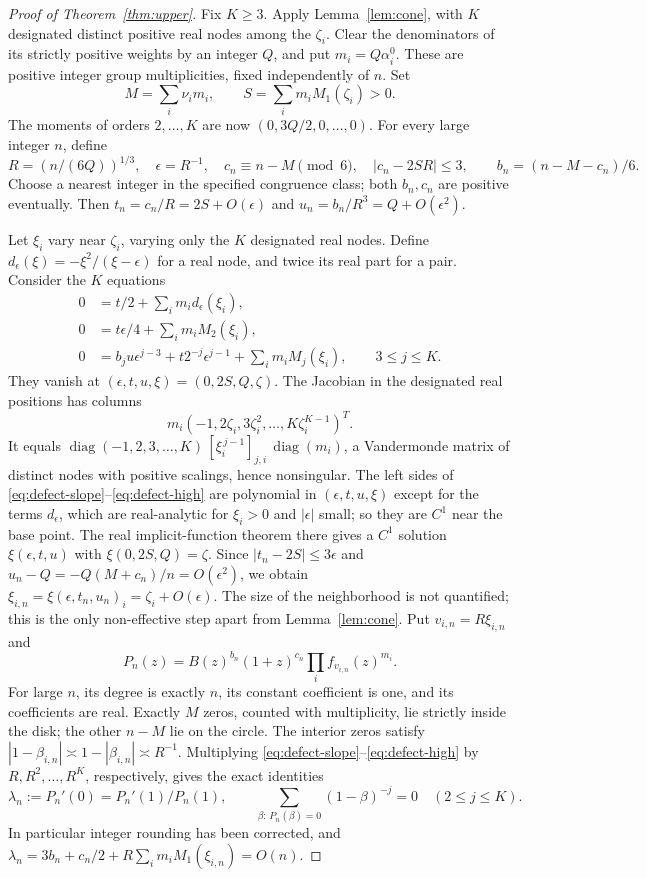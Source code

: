 \documentclass[11pt]{article}
\theoremstyle{remark}\newtheorem{remark}[theorem]{Remark}
\begin{document}
\begin{proof}[Proof of Theorem~\ref{thm:upper}]
Fix \(K\ge3\). Apply Lemma~\ref{lem:cone}, with \(K\) designated
distinct positive real nodes among the \(\zeta_i\). Clear the
denominators of its strictly positive weights by an integer \(Q\),
and put \(m_i=Q\alpha_i^0\). These are positive integer group
multiplicities, fixed independently of \(n\). Set
\[
 M=\sum_i\nu_i m_i,\qquad S=\sum_i m_i M_1(\zeta_i)>0.
\]
The moments of orders \(2,\ldots,K\) are now
\((0,3Q/2,0,\ldots,0)\).
For every large integer \(n\), define
\[
 R=(n/(6Q))^{1/3},\quad \epsilon=R^{-1},\quad
 c_n\equiv n-M\pmod6,\quad |c_n-2SR|\le3,
 \qquad b_n=(n-M-c_n)/6.
\]
Choose a nearest integer in the specified congruence class; both
\(b_n,c_n\) are positive eventually. Then
\(t_n=c_n/R=2S+O(\epsilon)\) and
\(u_n=b_n/R^3=Q+O(\epsilon^2)\).

Let \(\xi_i\) vary near \(\zeta_i\), varying only the \(K\)
designated real nodes. Define
\(d_\epsilon(\xi)=-\xi^2/(\xi-\epsilon)\) for a real node,
and twice its real part for a pair. Consider the \(K\) equations
\begin{align}
 0&=t/2+\sum_i m_i d_\epsilon(\xi_i),\label{eq:defect-slope}\\
 0&=t\epsilon/4+\sum_i m_i M_2(\xi_i),\label{eq:defect-two}\\
 0&=b_j u\epsilon^{j-3}+t2^{-j}\epsilon^{j-1}
       +\sum_i m_i M_j(\xi_i),\qquad 3\le j\le K.
       \label{eq:defect-high}
\end{align}
They vanish at \((\epsilon,t,u,\xi)=(0,2S,Q,\zeta)\).
The Jacobian in the designated real positions has columns
\[
 m_i(-1,2\zeta_i,3\zeta_i^2,\ldots,K\zeta_i^{K-1})^T.
\]
It equals \(\operatorname{diag}(-1,2,3,\ldots,K)\,[\xi_i^{\,j-1}]_{j,i}\,
\operatorname{diag}(m_i)\), a Vandermonde matrix of distinct nodes with
positive scalings, hence nonsingular. The left sides of
\eqref{eq:defect-slope}--\eqref{eq:defect-high} are polynomial in
\((\epsilon,t,u,\xi)\) except for the terms \(d_\epsilon\), which are
real-analytic for \(\xi_i>0\) and \(|\epsilon|\) small; so they are
\(C^1\) near the base point. The real implicit-function theorem there
gives a \(C^1\) solution \(\xi(\epsilon,t,u)\) with
\(\xi(0,2S,Q)=\zeta\). Since \(|t_n-2S|\le3\epsilon\) and
\(u_n-Q=-Q(M+c_n)/n=O(\epsilon^2)\), we obtain
\(\xi_{i,n}=\xi(\epsilon,t_n,u_n)_i=\zeta_i+O(\epsilon)\). The size of the
neighborhood is not quantified; this is the only non-effective step apart
from Lemma~\ref{lem:cone}. Put \(v_{i,n}=R\xi_{i,n}\) and
\[
 P_n(z)=B(z)^{b_n}(1+z)^{c_n}\prod_i f_{v_{i,n}}(z)^{m_i}.
\]
For large \(n\), its degree is exactly \(n\), its constant
coefficient is one, and its coefficients are real. Exactly \(M\)
zeros, counted with multiplicity, lie strictly inside the disk;
the other \(n-M\) lie on the circle. The interior zeros satisfy
\(|1-\beta_{i,n}|\asymp1-|\beta_{i,n}|\asymp R^{-1}\).
Multiplying \eqref{eq:defect-slope}--\eqref{eq:defect-high} by
\(R,R^2,\ldots,R^K\), respectively, gives the exact identities
\[
 \lambda_n:=P_n'(0)=P_n'(1)/P_n(1),\qquad
 \sum_{\beta:\,P_n(\beta)=0}(1-\beta)^{-j}=0
       \quad(2\le j\le K).
\]
In particular integer rounding has been corrected, and
\(\lambda_n=3b_n+c_n/2+R\sum_i m_iM_1(\xi_{i,n})=O(n)\).


\end{proof}
\end{document}
